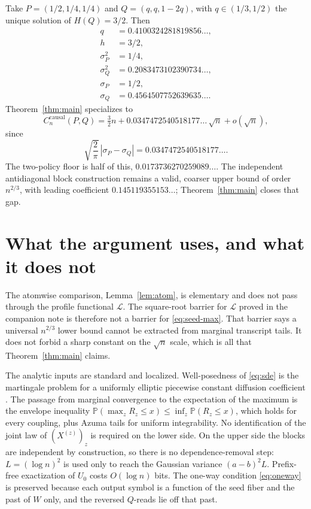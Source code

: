 \documentclass[11pt]{article}
\theoremstyle{definition}
\newcommand{\causal}{\mathrm{causal}}
\newcommand{\Prob}{\mathbb{P}}
\begin{document}
Take \(P=(1/2,1/4,1/4)\) and \(Q=(q,q,1-2q)\), with \(q\in(1/3,1/2)\) the unique solution of \(H(Q)=3/2\).
Then
\begin{align*}
  q&=0.4100324281819856\ldots,\\
  h&=3/2,\\
  \sigma_P^2&=1/4,\\
  \sigma_Q^2&=0.2083473102390734\ldots,\\
  \sigma_P&=1/2,\\
  \sigma_Q&=0.4564507752639635\ldots.
\end{align*}
Theorem~\ref{thm:main} specializes to
\begin{equation}
  \label{eq:crash}
  C_n^{\causal}(P,Q)
  =
  \tfrac32 n
  +0.0347472540518177\ldots\,\sqrt{n}
  +o(\sqrt{n}),
\end{equation}
since
\[
  \sqrt{\frac{2}{\pi}}\,|\sigma_P-\sigma_Q|
  =0.0347472540518177\ldots.
\]
The two-policy floor is half of this, \(0.0173736270259089\ldots\).
The independent antidiagonal block construction remains a valid, coarser upper bound of order \(n^{2/3}\), with leading coefficient \(0.145119355153\ldots\); Theorem~\ref{thm:main} closes that gap.

\section{What the argument uses, and what it does not}

The atomwise comparison, Lemma~\ref{lem:atom}, is elementary and does not pass through the profile functional \(\mathcal L\).
The square-root barrier for \(\mathcal L\) proved in the companion note is therefore not a barrier for \eqref{eq:seed-max}.
That barrier says a universal \(n^{2/3}\) lower bound cannot be extracted from marginal transcript tails.
It does not forbid a sharp constant on the \(\sqrt{n}\) scale, which is all that Theorem~\ref{thm:main} claims.

The analytic inputs are standard and localized.
Well-posedness of \eqref{eq:sde} is the martingale problem for a uniformly elliptic piecewise constant diffusion coefficient \cite{Lejay2006}.
The passage from marginal convergence to the expectation of the maximum is the envelope inequality \(\Prob(\max_z R_z\le x)\le\inf_z\Prob(R_z\le x)\), which holds for every coupling, plus Azuma tails for uniform integrability.
No identification of the joint law of \((X^{(z)})_z\) is required on the lower side.
On the upper side the blocks are independent by construction, so there is no dependence-removal step: \(L=(\log n)^2\) is used only to reach the Gaussian variance \((a-b)^2 L\).
Prefix-free exactization of \(U_0\) costs \(O(\log n)\) bits.
The one-way condition \eqref{eq:oneway} is preserved because each output symbol is a function of the seed fiber and the past of \(W\) only, and the reversed \(Q\)-reads lie off that past.
\end{document}
